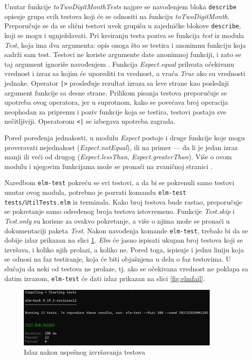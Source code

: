 \documentclass[12pt,oneside]{memoir}
\begin{document}
\par Unutar funkcije \emph{toTwoDigitMonthTests} najpre se navođenjem bloka \texttt{describe} opisuje grupa svih testova koji će se odnositi na funkciju \emph{toTwoDigitMonth}. Preporučuje se da se slični testovi uvek grupišu u zajedničke blokove \texttt{describe}, koji se mogu i ugnježdavati. Pri kreiranju testa poziva se funkcija \emph{test} iz modula \emph{Test}, koja ima dva argumenta: opis onoga što se testira i anonimnu funkciju koja sadrži sam test. Testovi ne koriste argumente date anonimnoj funkciji, i zato se taj argument ignoriše navođenjem \textunderscore. Funkcija \emph{Expect.equal} prihvata očekivanu vrednost i izraz sa kojim će uporediti tu vrednost, a vraća \emph{True} ako su vrednosti jednake. Operator \texttt{|>} prosleđuje rezultat izraza sa leve strane kao poslednji argument funkcije sa desne strane. Prilikom pisanja testova preporučuje se upotreba ovog operatora, jer u suprotnom, kako se povećava broj operacija neophodan za pripremu i poziv funkcije koja se testira, testovi postaju sve nečitljiviji. Operatorom \texttt{<|} se izbegava upotreba zagrada. 
\par Pored poređenja jednakosti, u modulu \emph{Expect} postoje i druge funkcije koje mogu proveravati nejednakost (\emph{Expect.notEqual}), ili na primer --- da li je jedan izraz manji ili veći od drugog (\emph{Expect.lessThan}, \emph{Expect.greaterThan}). Više o ovom modulu i njegovim funkcijama može se pronaći na zvaničnoj stranici \cite{expect}.
\par Naredbom \texttt{elm-test} pokreću se svi testovi, a da bi se pokrenuli samo testovi unutar ovog modula, potrebno je pozvati komandu \texttt{elm-test tests/UtilTests.elm} iz terminala. Kako broj testova bude rastao, preporučuje se pokretanje samo određenog broja testova istovremeno. Funkcije \emph{Test.skip} i \emph{Test.only} su korisne za ovakvo pokretanje, a više o njima može se pronaći u dokumentaciji paketa \emph{Test}.  Nakon navođenja komande \texttt{elm-test}, trebalo bi da se dobije izlaz prikazan na slici \ref{fig:elmpass}. \emph{Elm} će jasno ispisati ukupan broj testova koji se izvršava, i koliko njih prolazi, a koliko ne. Pored toga, ispisuje i jednu liniju koja se odnosi na faz testiranje, koja će biti objašnjena u delu o faz testovima. U slučaju da neki od testova ne prolaze, tj. ako se očekivana vrednost ne poklapa sa datim izrazom, \texttt{elm-test} će dati izlaz prikazan na slici \ref{fig:elmfail}. 

\begin{figure}[!ht]
  \centering
  \includegraphics[width=0.9\textwidth]{elmpass.png}
  \caption{Izlaz nakon uspešnog izvršavanja testova}
  \label{fig:elmpass}
\end{figure}
\end{document}
